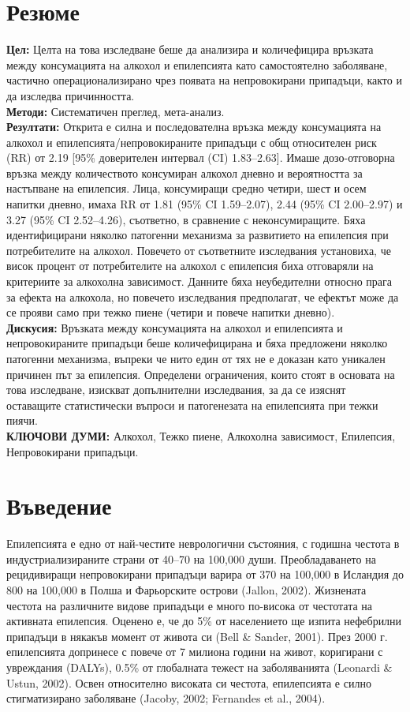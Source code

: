 \documentclass{article}
\begin{document}
\section*{Резюме}
\textbf{Цел:} Целта на това изследване беше да анализира и количефицира връзката между консумацията на алкохол и епилепсията като самостоятелно заболяване, частично операционализирано чрез появата на непровокирани припадъци, както и да изследва причинността.\\
\textbf{Методи:} Систематичен преглед, мета-анализ.\\
\textbf{Резултати:} Открита е силна и последователна връзка между консумацията на алкохол и епилепсията/непровокираните припадъци с общ относителен риск (RR) от 2.19 [95\% доверителен интервал (CI) 1.83–2.63]. Имаше дозо-отговорна връзка между количеството консумиран алкохол дневно и вероятността за настъпване на епилепсия. Лица, консумиращи средно четири, шест и осем напитки дневно, имаха RR от 1.81 (95\% CI 1.59–2.07), 2.44 (95\% CI 2.00–2.97) и 3.27 (95\% CI 2.52–4.26), съответно, в сравнение с неконсумиращите. Бяха идентифицирани няколко патогенни механизма за развитието на епилепсия при потребителите на алкохол. Повечето от съответните изследвания установиха, че висок процент от потребителите на алкохол с епилепсия биха отговаряли на критериите за алкохолна зависимост. Данните бяха неубедителни относно прага за ефекта на алкохола, но повечето изследвания предполагат, че ефектът може да се прояви само при тежко пиене (четири и повече напитки дневно).\\
\textbf{Дискусия:} Връзката между консумацията на алкохол и епилепсията и непровокираните припадъци беше количефицирана и бяха предложени няколко патогенни механизма, въпреки че нито един от тях не е доказан като уникален причинен път за епилепсия. Определени ограничения, които стоят в основата на това изследване, изискват допълнителни изследвания, за да се изяснят оставащите статистически въпроси и патогенезата на епилепсията при тежки пиячи.\\
\textbf{КЛЮЧОВИ ДУМИ:} Алкохол, Тежко пиене, Алкохолна зависимост, Епилепсия, Непровокирани припадъци.

\section*{Въведение}
Епилепсията е едно от най-честите неврологични състояния, с годишна честота в индустриализираните страни от 40–70 на 100,000 души. Преобладаването на рецидивиращи непровокирани припадъци варира от 370 на 100,000 в Исландия до 800 на 100,000 в Полша и Фарьорските острови (Jallon, 2002). Жизнената честота на различните видове припадъци е много по-висока от честотата на активната епилепсия. Оценено е, че до 5\% от населението ще изпита нефебрилни припадъци в някакъв момент от живота си (Bell \& Sander, 2001). През 2000 г. епилепсията допринесе с повече от 7 милиона години на живот, коригирани с увреждания (DALYs), 0.5\% от глобалната тежест на заболяванията (Leonardi \& Ustun, 2002). Освен относително високата си честота, епилепсията е силно стигматизирано заболяване (Jacoby, 2002; Fernandes et al., 2004).
\end{document}
